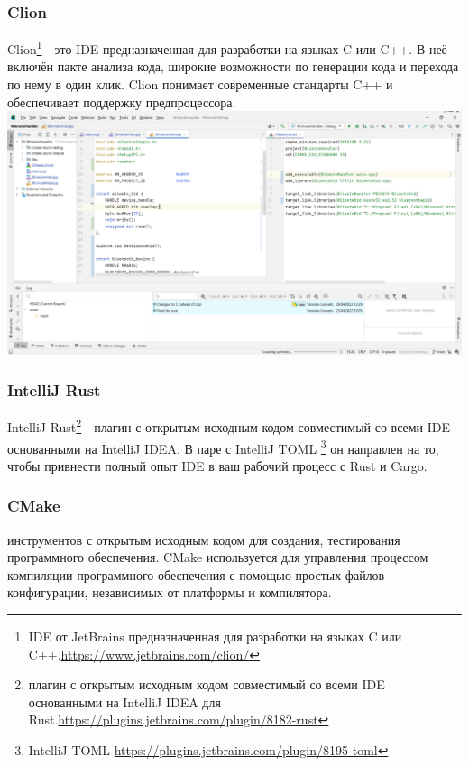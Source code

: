 \subsubsection{Clion}
\quad Clion\footnote{IDE от JetBrains предназначенная для разработки на языках C или C++.\href{ https://www.jetbrains.com/clion/}{https://www.jetbrains.com/clion/}}
- это IDE предназначенная для разработки на языках C или C++.
В неё включён пакте анализа кода, широкие возможности по генерации кода и перехода по нему в один клик.
Clion понимает современные стандарты C++ и обеспечивает поддержку предпроцессора.
\includegraphics[width=\textwidth]{content/clion_screenshot}

\subsubsection{IntelliJ Rust}
\quad IntelliJ Rust\footnote{плагин с открытым исходным кодом совместимый со всеми IDE основанными на IntelliJ IDEA для Rust.\href{ https://plugins.jetbrains.com/plugin/8182-rust}{https://plugins.jetbrains.com/plugin/8182-rust}}
- плагин с открытым исходным кодом совместимый со всеми IDE основанными на IntelliJ IDEA\@.
В паре с IntelliJ TOML  \footnote{IntelliJ TOML \href{ https://plugins.jetbrains.com/plugin/8195-toml}{https://plugins.jetbrains.com/plugin/8195-toml}} он направлен на то, чтобы привнести полный опыт IDE в ваш рабочий процесс с Rust и Cargo.

\subsubsection{CMake}
\quad {} инструментов с открытым исходным кодом для создания, тестирования программного обеспечения.
 CMake используется для управления процессом компиляции программного обеспечения с помощью простых файлов конфигурации,
 независимых от платформы и компилятора.